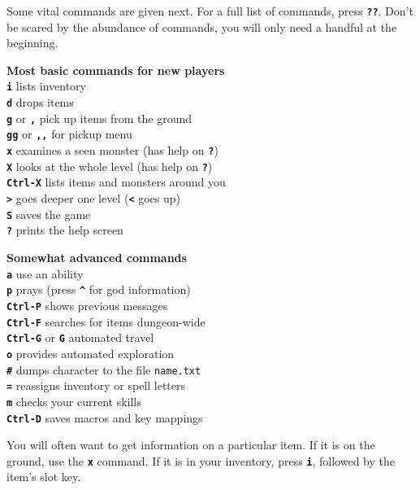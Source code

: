 \documentclass[a4paper,10pt]{article}
\newcommand{\key}[1]{{{\texttt{\textbf{#1}}}}} %
\newcommand{\sex}[1]{{{\textbf{#1}}}} %
\newcommand{\spacecolumn}{\begin{minipage}[t]{2cm}\phantom{xxxx}\end{minipage}}
\newcommand{\para}{\vspace{1.5ex}}
\begin{document}
\para

Some vital commands are given next. For a full list of commands, press \key{??}.
Don't be scared by the abundance of commands, you will only need a handful at 
the beginning. 

\para

\begin{minipage}[t]{7cm}
\sex{Most basic commands for new players} \\
\key{i} lists inventory \\
\key{d}	drops items \\
\key{g} or \key{,} pick up items from the ground \\
\key{gg} or \key{,,} for pickup menu \\
\key{x} examines a seen monster (has help on \key{?}) \\
\key{X} looks at the whole level (has help on \key{?}) \\
\key{Ctrl-X} lists items and monsters around you \\
\key{>} goes deeper one level (\key{<} goes up) \\
\key{S} saves the game \\
\key{?} prints the help screen
\end{minipage}
%
\spacecolumn
%
\begin{minipage}[t]{7cm}
\sex{Somewhat advanced commands} \\
\key{a} use an ability \\
\key{p} prays (press \key{\^} for god information) \\
\key{Ctrl-P} shows previous messages \\
\key{Ctrl-F} searches for items dungeon-wide \\
\key{Ctrl-G} or \key{G} automated travel \\
\key{o} provides automated exploration \\
\key{\#} dumps character to the file \texttt{name.txt} \\
\key{=} reassigns inventory or spell letters \\
\key{m} checks your current skills \\ 
\key{Ctrl-D} saves macros and key mappings
\end{minipage}

\para

You will often want to get information on a particular item. If it is on the
ground, use the \key{x} command. If it is in your inventory, press \key{i},
followed by the item's slot key.
\end{document}
